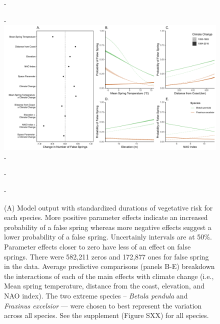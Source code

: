 \documentclass{article}\usepackage[]{graphicx}\usepackage[]{color}
\begin{document}
  
{\begin{figure} [H]
  -\begin{center}
  -\includegraphics[width=16cm]{..//figures/MainModel_wAPCplots.pdf}
  -\caption{(A) Model output with standardized durations of vegetative risk for each species. More positive parameter effects indicate an increased probability of a false spring whereas more negative effects suggest a lower probability of a false spring. Uncertainly intervals are at 50\%. Parameter effects closer to zero have less of an effect on false springs. There were 582,211 zeros and 172,877 ones for false spring in the data. Average predictive comparisons (panels B-E) breakdown the interactions of each of the main effects with climate change (i.e., Mean spring temperature, distance from the coast, elevation, and NAO index). The two extreme species -- \textit{Betula pendula} and \textit{Fraxinus excelsior} --- were chosen to best represent the variation across all species. See the supplement (Figure SXX) for all species.
  }\label{fig:maineffects}
  -\end{center}
  -\end{figure}}


  
\end{document}
